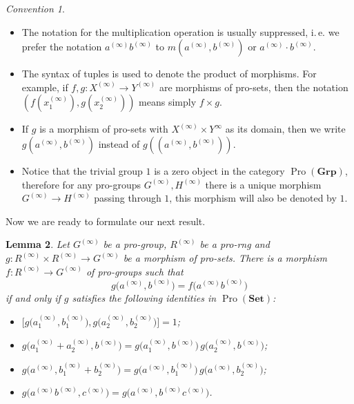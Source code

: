 \documentclass{article}
\numberwithin{equation}{section}
\newtheorem{lemma}{Lemma} \numberwithin{lemma}{section}
\theoremstyle{definition}
\theoremstyle{remark}
\newtheorem{conv}[lemma]{Convention} \Crefname{conv}{Convention}{Conventions}
\DeclareMathOperator{\Pro}{Pro}
\newcommand{\Set}{\mathbf{Set}}
\newcommand{\Group}{\mathbf{Grp}}
\begin{document}
\begin{conv}
\begin{itemize}
  \item The notation for the multiplication operation is usually suppressed, i.\,e. we prefer the notation $a^{(\infty)} b^{(\infty)}$ to $m(a^{(\infty)}, b^{(\infty)})$ or $a^{(\infty)} \cdot b^{(\infty)}$.
  \item The syntax of tuples is used to denote the product of morphisms. For example, if $f,g \colon X^{(\infty)} \to Y^{(\infty)}$ are morphisms of pro-sets, then the notation $(f(x_1^{(\infty)}), g(x_2^{(\infty)}))$ means simply $f\times g$.
  \item If $g$ is a morphism of pro-sets with $X^{(\infty)} \times Y^{\infty}$ as its domain, then we write $g(a^{(\infty)}, b^{(\infty)})$ instead of $g((a^{(\infty)}, b^{(\infty)}))$.
  \item Notice that the trivial group $1$ is a zero object in the category $\Pro(\Group)$, therefore for any pro-groups $G^{(\infty)}, H^{(\infty)}$ there is a unique morphism $G^{(\infty)} \to H^{(\infty)}$ passing through $1$, this morphism will also be denoted by $1$.
 \end{itemize}
\end{conv} 
Now we are ready to formulate our next result.
\begin{lemma}\label{RingPresentation}
Let \(G^{(\infty)}\) be a pro-group, $R^{(\infty)}$ be a pro-rng and \(g \colon R^{(\infty)} \times R^{(\infty)} \to G^{(\infty)}\) be a morphism of pro-sets. There is a morphism \(f \colon R^{(\infty)} \to G^{(\infty)}\) of pro-groups such that
\[g\bigl(a^{(\infty)} , b^{(\infty)}\bigr) = f\bigl(a^{(\infty)} b^{(\infty)}\bigr)\]
if and only if \(g\) satisfies the following identities in $\Pro(\Set)$:
\begin{itemize}
\item \(\bigl[g\bigl(a_1^{(\infty)}, b_1^{(\infty)}\bigr), g\bigl(a_2^{(\infty)}, b_2^{(\infty)}\bigr)\bigr] = 1\);
\item \(g\bigl(a_1^{(\infty)} + a_2^{(\infty)}, b^{(\infty)}\bigr) = g\bigl(a_1^{(\infty)}, b^{(\infty)}\bigr)\, g\bigl(a_2^{(\infty)}, b^{(\infty)}\bigr)\);
\item \(g\bigl(a^{(\infty)}, b_1^{(\infty)} + b_2^{(\infty)}\bigr) = g\bigl(a^{(\infty)}, b_1^{(\infty)}\bigr)\, g\bigl(a^{(\infty)}, b_2^{(\infty)}\bigr)\);
\item \(g\bigl(a^{(\infty)} b^{(\infty)}, c^{(\infty)}\bigr) = g\bigl(a^{(\infty)}, b^{(\infty)} c^{(\infty)}\bigr)\).
\end{itemize}
\end{lemma}
\end{document}
